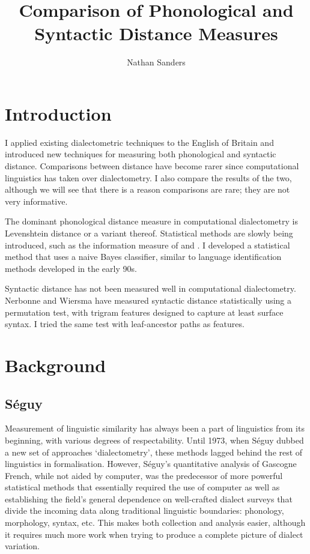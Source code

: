 \documentclass[11pt]{article}
\title{Comparison of Phonological and Syntactic Distance Measures}
\author{Nathan Sanders}
\begin{document}
\maketitle
\section{Introduction}

I applied existing dialectometric techniques to the English of Britain
and introduced new techniques for measuring both phonological and
syntactic distance. Comparisons between distance have become rarer
since computational linguistics has taken over dialectometry. I also
compare the results of the two, although we will see that there is a
reason comparisons are rare; they are not very informative.

The dominant phonological distance measure in computational
dialectometry is Levenshtein distance or a variant
thereof. Statistical methods are slowly being introduced, such as the
information measure of \cite{hinrichs07} and \cite{sanders08}.
I developed a statistical method that uses a naive Bayes
classifier, similar to language identification methods developed in
the early 90s.

Syntactic distance has not been measured well in computational
dialectometry. Nerbonne and Wiersma have measured syntactic distance
statistically using a permutation test, with trigram features designed
to capture at least surface syntax. I tried the same test with
leaf-ancestor paths as features.

\section{Background}
\subsection{S\'eguy}
Measurement of linguistic similarity has always been a part of
linguistics from its beginning, with various degrees of
respectability. Until 1973, when S\'eguy dubbed a new set of
approaches `dialectometry', these methods lagged behind the rest of
linguistics in formalisation. However, S\'eguy's quantitative analysis
of Gascogne French, while not aided by computer, was the predecessor
of more powerful statistical methods that essentially required the use
of computer as well as establishing the field's general dependence on
well-crafted dialect surveys that divide the incoming data along
traditional linguistic boundaries: phonology, morphology, syntax, etc.
This makes both collection and analysis easier, although it requires
much more work when trying to produce a complete picture of dialect
variation.
\end{document}
